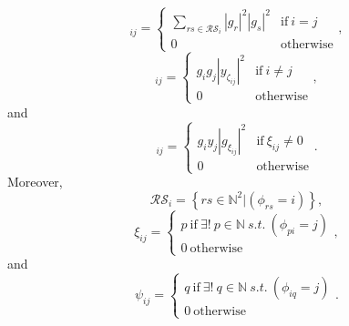 \documentclass[useAMS,usenatbib]{mn2e}
\newcommand{\bE}{\bmath{E}}
\newcommand{\bF}{\bmath{F}}
\begin{document}
\begin{equation}
[\bE]_{ij} = 
\begin{cases}
 \sum_{rs \in \mathcal{RS}_i} \left | g_r \right |^2 \left | g_s \right |^2  & \textrm{if} ~ i=j\\
 0 & \textrm{otherwise}
\end{cases},
\end{equation}
\begin{equation}
[\bF]_{ij} = 
\begin{cases}
 g_i g_j  \left | y_{\zeta_{ij}} \right |^2  & \textrm{if} ~ i \neq j\\
 0 & \textrm{otherwise}
\end{cases},
\end{equation}
and
\begin{equation}
[\boldsymbol{G}]_{ij} = 
\begin{cases}
 g_i y_j  \left | g_{\xi_{ij}} \right |^2  & \textrm{if} ~ \xi_{ij}\neq0\\
 0 & \textrm{otherwise}
\end{cases}.
\end{equation}
Moreover, 
\begin{equation}
\label{eq:RS}
\mathcal{RS}_i = \left\{rs\in\mathbb{N}^2|(\phi_{rs} = i) \right\},
\end{equation}
\begin{equation}
\xi_{ij} = 
\begin{cases}
p~\textrm{if}~\exists! ~ p \in \mathbb{N} ~ s.t. ~(\phi_{pi} = j)\\
0~\textrm{otherwise}
\end{cases},
\end{equation}
and
\begin{equation}
\psi_{ij} = 
\begin{cases}
q~\textrm{if}~\exists! ~ q \in \mathbb{N} ~ s.t. ~(\phi_{iq} = j)\\
0~\textrm{otherwise}
\end{cases}.
\end{equation}
\end{document}
